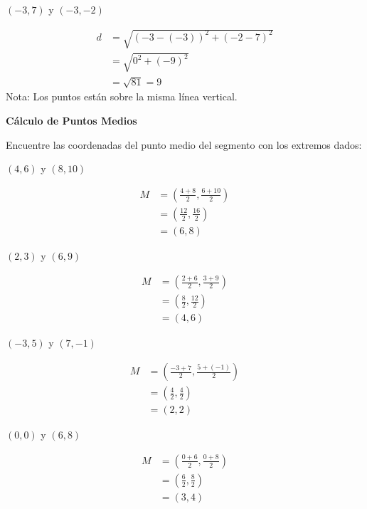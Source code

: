 \begin{exercise}
\problem $(-3, 7)$ y $(-3, -2)$
\begin{solucion}
\begin{align*}
d &= \sqrt{(-3-(-3))^2 + (-2-7)^2} \\
  &= \sqrt{0^2 + (-9)^2} \\
  &= \sqrt{81} = 9
\end{align*}
Nota: Los puntos están sobre la misma línea vertical.
\end{solucion}
\end{exercise}

\begin{exercise}
\textbf{Cálculo de Puntos Medios}

Encuentre las coordenadas del punto medio del segmento con los extremos dados:

\problem $(4, 6)$ y $(8, 10)$
\begin{solucion}
\begin{align*}
M &= \left(\frac{4+8}{2}, \frac{6+10}{2}\right) \\
  &= \left(\frac{12}{2}, \frac{16}{2}\right) \\
  &= (6, 8)
\end{align*}
\end{solucion}

\problem $(2, 3)$ y $(6, 9)$
\begin{solucion}
\begin{align*}
M &= \left(\frac{2+6}{2}, \frac{3+9}{2}\right) \\
  &= \left(\frac{8}{2}, \frac{12}{2}\right) \\
  &= (4, 6)
\end{align*}
\end{solucion}

\problem $(-3, 5)$ y $(7, -1)$
\begin{solucion}
\begin{align*}
M &= \left(\frac{-3+7}{2}, \frac{5+(-1)}{2}\right) \\
  &= \left(\frac{4}{2}, \frac{4}{2}\right) \\
  &= (2, 2)
\end{align*}
\end{solucion}

\problem $(0, 0)$ y $(6, 8)$
\begin{solucion}
\begin{align*}
M &= \left(\frac{0+6}{2}, \frac{0+8}{2}\right) \\
  &= \left(\frac{6}{2}, \frac{8}{2}\right) \\
  &= (3, 4)
\end{align*}
\end{solucion}


\end{exercise}
